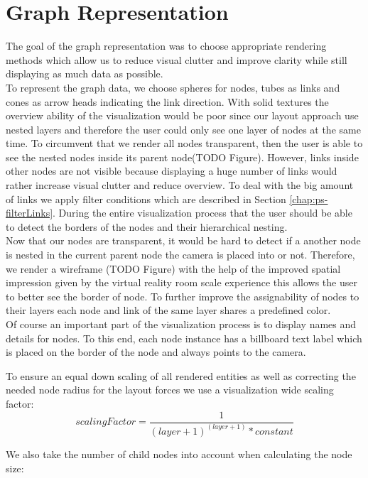 \section{Graph Representation}
\label{chap:ps-graphRepresentation}
The goal of the graph representation was to choose appropriate rendering methods which allow us to reduce visual clutter and improve clarity while still displaying as much data as possible.\\
To represent the graph data, we choose spheres for nodes, tubes as links and cones as arrow heads indicating the link direction.
With solid textures the overview ability of the visualization would be poor since our layout approach use nested layers and therefore the user could only see one layer of nodes at the same time. To circumvent that we render all nodes transparent, then the user is able to see the nested nodes inside its parent node(TODO Figure). 
However, links inside other nodes are not visible because displaying a huge number of links would rather increase visual clutter and reduce overview. To deal with the big amount of links we apply filter conditions which are described in Section \ref{chap:ps-filterLinks}.
During the entire visualization process that the user should be able to detect the borders of the nodes and their hierarchical nesting.\\ Now that our nodes are transparent, it would be hard to detect if a another node is nested in the current parent node the camera is placed into or not. Therefore, we render a wireframe (TODO Figure) with the help of the improved spatial impression given by the virtual reality room scale experience this allows the user to better see the border of node. To further improve the assignability of nodes to their layers each node and link of the same layer shares a predefined color.\\
Of course an important part of the visualization process is to display names and details for nodes. To this end, each node instance has a billboard text label which is placed on the border of the node and always points to the camera.

To ensure an equal down scaling of all rendered entities as well as correcting the needed node radius for the layout forces we use a visualization wide scaling factor:
\begin{equation}
    scalingFactor = \frac{1}{(layer+1)^{(layer+1)} * constant}
\end{equation}

We also take the number of child nodes into account when calculating the node size: 

